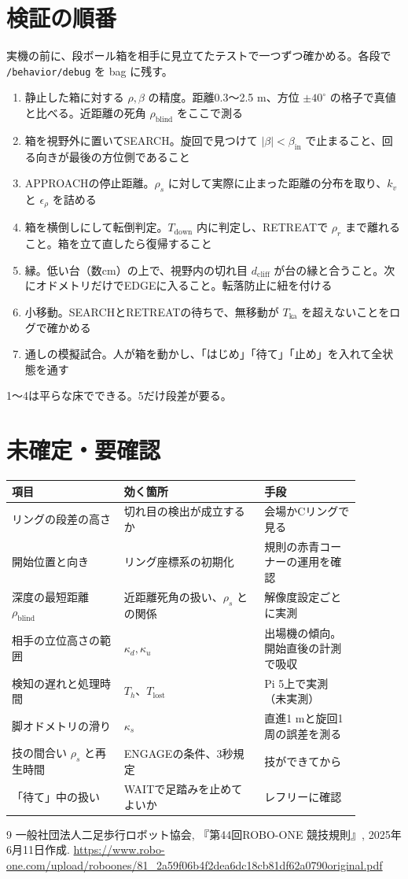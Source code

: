 \documentclass[a4paper,11pt]{ltjsarticle}
\newcommand{\code}[1]{\texttt{#1}}
\begin{document}
\section{検証の順番}\label{sec:verify}

実機の前に、段ボール箱を相手に見立てたテストで一つずつ確かめる。各段で \code{/behavior/debug} を bag に残す。
\begin{enumerate}
\item 静止した箱に対する $\rho,\beta$ の精度。距離0.3〜2.5 m、方位 $\pm40^\circ$ の格子で真値と比べる。近距離の死角 $\rho_\mathrm{blind}$ をここで測る
\item 箱を視野外に置いてSEARCH。旋回で見つけて $|\beta|<\beta_\mathrm{in}$ で止まること、回る向きが最後の方位側であること
\item APPROACHの停止距離。$\rho_s$ に対して実際に止まった距離の分布を取り、$k_v$ と $\epsilon_\rho$ を詰める
\item 箱を横倒しにして転倒判定。$T_\mathrm{down}$ 内に判定し、RETREATで $\rho_r$ まで離れること。箱を立て直したら復帰すること
\item 縁。低い台（数cm）の上で、視野内の切れ目 $d_\mathrm{cliff}$ が台の縁と合うこと。次にオドメトリだけでEDGEに入ること。転落防止に紐を付ける
\item 小移動。SEARCHとRETREATの待ちで、無移動が $T_\mathrm{ka}$ を超えないことをログで確かめる
\item 通しの模擬試合。人が箱を動かし、「はじめ」「待て」「止め」を入れて全状態を通す
\end{enumerate}
1〜4は平らな床でできる。5だけ段差が要る。

\section{未確定・要確認}

\begin{center}\small
\begin{tabular}{p{0.29\linewidth}p{0.35\linewidth}p{0.24\linewidth}}
\toprule
項目 & 効く箇所 & 手段 \\
\midrule
リングの段差の高さ & 切れ目の検出が成立するか & 会場かCリングで見る \\
開始位置と向き & リング座標系の初期化 & 規則の赤青コーナーの運用を確認 \\
深度の最短距離 $\rho_\mathrm{blind}$ & 近距離死角の扱い、$\rho_s$ との関係 & 解像度設定ごとに実測 \\
相手の立位高さの範囲 & $\kappa_d,\kappa_u$ & 出場機の傾向。開始直後の計測で吸収 \\
検知の遅れと処理時間 & $T_h$、$T_\mathrm{lost}$ & Pi 5上で実測（未実測） \\
脚オドメトリの滑り & $\kappa_s$ & 直進1 mと旋回1周の誤差を測る \\
技の間合い $\rho_s$ と再生時間 & ENGAGEの条件、3秒規定 & 技ができてから \\
「待て」中の扱い & WAITで足踏みを止めてよいか & レフリーに確認 \\
\bottomrule
\end{tabular}
\end{center}

\begin{thebibliography}{9}
 一般社団法人二足歩行ロボット協会, 『第44回ROBO-ONE 競技規則』, 2025年6月11日作成.\newline
\url{https://www.robo-one.com/upload/roboones/81_2a59f06b4f2dea6dc18cb81df62a0790original.pdf}
\end{thebibliography}
\end{document}
